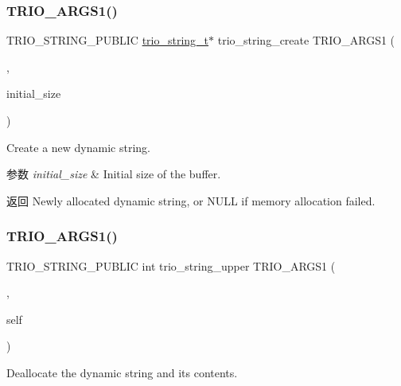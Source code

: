 \subsubsection{\texorpdfstring{T\+R\+I\+O\+\_\+\+A\+R\+G\+S1()}{TRIO\_ARGS1()}\hspace{0.1cm}{\footnotesize\ttfamily [1/2]}}
{\footnotesize\ttfamily T\+R\+I\+O\+\_\+\+S\+T\+R\+I\+N\+G\+\_\+\+P\+U\+B\+L\+IC \hyperlink{struct__trio__string__t}{trio\+\_\+string\+\_\+t}$\ast$ trio\+\_\+string\+\_\+create T\+R\+I\+O\+\_\+\+A\+R\+G\+S1 (\begin{DoxyParamCaption}\item[{(initial\+\_\+size)}]{,  }\item[{int}]{initial\+\_\+size }\end{DoxyParamCaption})}

Create a new dynamic string.


\begin{DoxyParams}{参数}
{\em initial\+\_\+size} & Initial size of the buffer. \\
\hline
\end{DoxyParams}
\begin{DoxyReturn}{返回}
Newly allocated dynamic string, or N\+U\+LL if memory allocation failed. 
\end{DoxyReturn}
\mbox{\label{group___dynamic_strings_ga57398879c57ffad9cf943c5646b8d652}} 
\subsubsection{\texorpdfstring{T\+R\+I\+O\+\_\+\+A\+R\+G\+S1()}{TRIO\_ARGS1()}\hspace{0.1cm}{\footnotesize\ttfamily [2/2]}}
{\footnotesize\ttfamily T\+R\+I\+O\+\_\+\+S\+T\+R\+I\+N\+G\+\_\+\+P\+U\+B\+L\+IC int trio\+\_\+string\+\_\+upper T\+R\+I\+O\+\_\+\+A\+R\+G\+S1 (\begin{DoxyParamCaption}\item[{(self)}]{,  }\item[{\hyperlink{struct__trio__string__t}{trio\+\_\+string\+\_\+t} $\ast$}]{self }\end{DoxyParamCaption})}

Deallocate the dynamic string and its contents.


